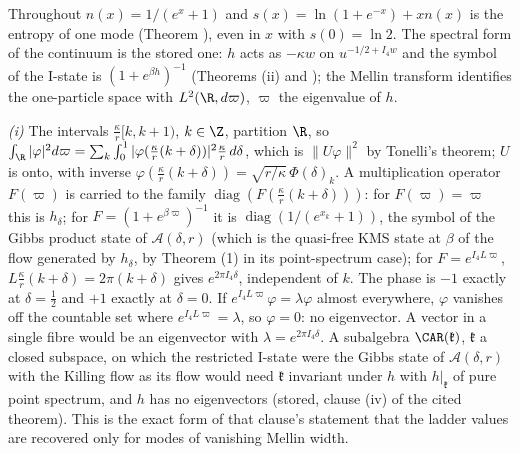 Throughout $n(x) = 1/(e^{x} + 1)$ and $s(x) = \ln(1 + e^{-x}) + xn(x)$ is the entropy of one mode (Theorem ), even in $x$ with $s(0) = \ln 2$. The spectral form of the continuum is the stored one: $h$ acts as $-\kappa w$ on $u^{-1/2 + I_4w}$ and the symbol of the I-state is $(1 + e^{\beta h})^{-1}$ (Theorems (ii) and ); the Mellin transform identifies the one-particle space with $L^{2}(\R, d\varpi)$, $\varpi$ the eigenvalue of $h$.

\emph{(i)} The intervals $\tfrac{\kappa}{r}[k, k + 1)$, $k \in \Z$, partition $\R$, so $\int_{\R}|\varphi|^{2}d\varpi = \sum_{k}\int_{0}^{1}|\varphi(\tfrac{\kappa}{r}(k + \delta))|^{2}\tfrac{\kappa}{r}\,d\delta$, which is $\|U\varphi\|^{2}$ by Tonelli's theorem; $U$ is onto, with inverse $\varphi(\tfrac{\kappa}{r}(k + \delta)) = \sqrt{r/\kappa}\,\Phi(\delta)_{k}$. A multiplication operator $F(\varpi)$ is carried to the family $\operatorname{diag}(F(\tfrac{\kappa}{r}(k + \delta)))$: for $F(\varpi) = \varpi$ this is $h_{\delta}$; for $F = (1 + e^{\beta\varpi})^{-1}$ it is $\operatorname{diag}(1/(e^{x_{k}} + 1))$, the symbol of the Gibbs product state of $\mathcal{A}(\delta, r)$ (which is the quasi-free KMS state at $\beta$ of the flow generated by $h_{\delta}$, by Theorem (1) in its point-spectrum case); for $F = e^{I_4L\varpi}$, $L\tfrac{\kappa}{r}(k + \delta) = 2\pi(k + \delta)$ gives $e^{2\pi I_4\delta}$, independent of $k$. The phase is $-1$ exactly at $\delta = \tfrac12$ and $+1$ exactly at $\delta = 0$. If $e^{I_4L\varpi}\varphi = \lambda\varphi$ almost everywhere, $\varphi$ vanishes off the countable set where $e^{I_4L\varpi} = \lambda$, so $\varphi = 0$: no eigenvector. A vector in a single fibre would be an eigenvector with $\lambda = e^{2\pi I_4\delta}$. A subalgebra $\CAR(\mathfrak{k})$, $\mathfrak{k}$ a closed subspace, on which the restricted I-state were the Gibbs state of $\mathcal{A}(\delta, r)$ with the Killing flow as its flow would need $\mathfrak{k}$ invariant under $h$ with $h|_{\mathfrak{k}}$ of pure point spectrum, and $h$ has no eigenvectors (stored, clause (iv) of the cited theorem). This is the exact form of that clause's statement that the ladder values are recovered only for modes of vanishing Mellin width.

